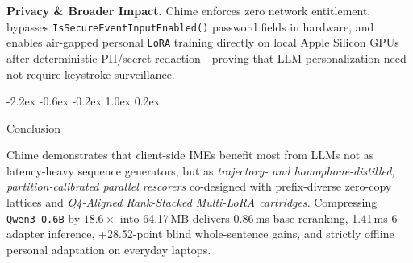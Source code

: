 \documentclass[10pt,twocolumn,letterpaper]{article}
\makeatletter
\renewcommand\section{\@startsection {section}{1}{\z@}%
  {-2.2ex \@plus -0.6ex \@minus -0.2ex}%
  {1.0ex \@plus 0.2ex}%
  {\normalfont\large\bfseries\raggedright}}
\makeatother
\begin{document}
\textbf{Privacy \& Broader Impact.} Chime enforces zero network entitlement, bypasses \texttt{IsSecureEventInputEnabled()} password fields in hardware, and enables air-gapped personal \texttt{LoRA} training directly on local Apple Silicon GPUs after deterministic PII/secret redaction---proving that LLM personalization need not require keystroke surveillance.

\section{Conclusion}

Chime demonstrates that client-side IMEs benefit most from LLMs not as latency-heavy sequence generators, but as \emph{trajectory- and homophone-distilled, partition-calibrated parallel rescorers} co-designed with prefix-diverse zero-copy lattices and \emph{Q4-Aligned Rank-Stacked Multi-LoRA cartridges}. Compressing \texttt{Qwen3-0.6B} by $18.6\times$ into 64.17\,MB delivers 0.86\,ms base reranking, 1.41\,ms 6-adapter inference, +28.52-point blind whole-sentence gains, and strictly offline personal adaptation on everyday laptops.


\end{document}
